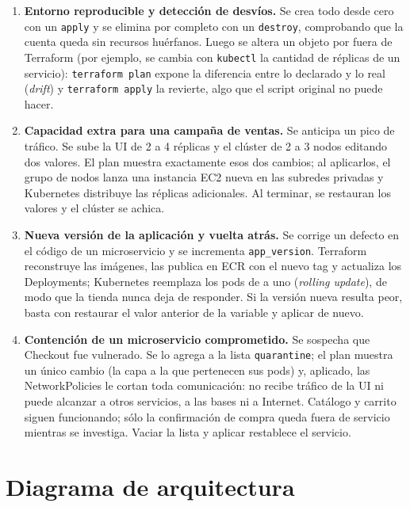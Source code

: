 \documentclass[11pt,a4paper]{article}
\newcommand{\code}[1]{\texttt{#1}}
\begin{document}
\begin{enumerate}
  \item \textbf{Entorno reproducible y detección de desvíos.} Se crea todo desde cero con un
    \code{apply} y se elimina por completo con un \code{destroy}, comprobando que la cuenta
    queda sin recursos huérfanos. Luego se altera un objeto por fuera de Terraform (por
    ejemplo, se cambia con \code{kubectl} la cantidad de réplicas de un servicio):
    \code{terraform plan} expone la diferencia entre lo declarado y lo real (\emph{drift}) y
    \code{terraform apply} la revierte, algo que el script original no puede hacer.

  \item \textbf{Capacidad extra para una campaña de ventas.} Se anticipa un pico de tráfico.
    Se sube la UI de 2 a 4 réplicas y el clúster de 2 a 3 nodos editando dos valores. El plan
    muestra exactamente esos dos cambios; al aplicarlos, el grupo de nodos lanza una instancia
    EC2 nueva en las subredes privadas y Kubernetes distribuye las réplicas adicionales. Al
    terminar, se restauran los valores y el clúster se achica.

  \item \textbf{Nueva versión de la aplicación y vuelta atrás.} Se corrige un defecto en el
    código de un microservicio y se incrementa \code{app\_version}. Terraform reconstruye las
    imágenes, las publica en ECR con el nuevo tag y actualiza los Deployments; Kubernetes
    reemplaza los pods de a uno (\emph{rolling update}), de modo que la tienda nunca deja de
    responder. Si la versión nueva resulta peor, basta con restaurar el valor anterior de la
    variable y aplicar de nuevo.

  \item \textbf{Contención de un microservicio comprometido.} Se sospecha que Checkout fue
    vulnerado. Se lo agrega a la lista \code{quarantine}; el plan muestra un único cambio (la
    capa a la que pertenecen sus pods) y, aplicado, las NetworkPolicies le cortan toda
    comunicación: no recibe tráfico de la UI ni puede alcanzar a otros servicios, a las bases
    ni a Internet. Catálogo y carrito siguen funcionando; sólo la confirmación de compra queda
    fuera de servicio mientras se investiga. Vaciar la lista y aplicar restablece el servicio.
\end{enumerate}

\section{Diagrama de arquitectura}
\end{document}
